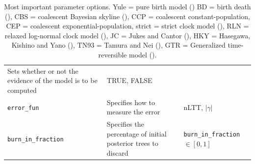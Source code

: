 \begin{table}
\begin{tabular}{|p{3.4cm}|p{9.7cm}|p{4.5cm}@{}|}
    Sets whether or not the evidence of the model is to be computed &
    TRUE, FALSE \\
    \verb;error_fun; &
    Specifies how to measure the error &
    nLTT, $|\gamma|$ \\
    \verb;burn_in_fraction; &
    Specifies the percentage of initial posterior trees to discard &
    \verb;burn_in_fraction; $\in [0, 1]$\\
    \hline
  \end{tabular}
  \caption{
    Most important parameter options.
    Yule = pure birth model (\cite{yule})
    BD = birth death (\cite{nee1994reconstructed}), 
    CBS = coalescent Bayesian skyline (\cite{drummond2005bayesian}), 
    CCP = coalescent constant-population, 
    CEP = coalescent exponential-population,
    strict = strict clock model (\cite{zuckerkandl1965molecules}),
    RLN = relaxed log-normal clock model (\cite{drummond2006relaxed}),
    JC = Jukes and Cantor (\cite{jukes1969evolution}), 
    HKY = Hasegawa, Kishino and Yano (\cite{hasegawa1985dating}), 
    TN93 = Tamura and Nei (\cite{tamura1993estimation}), 
    GTR = Generalized time-reversible model (\cite{tavare1986some}).
  }
  \label{tab:options}
\bigskip


\end{table}
